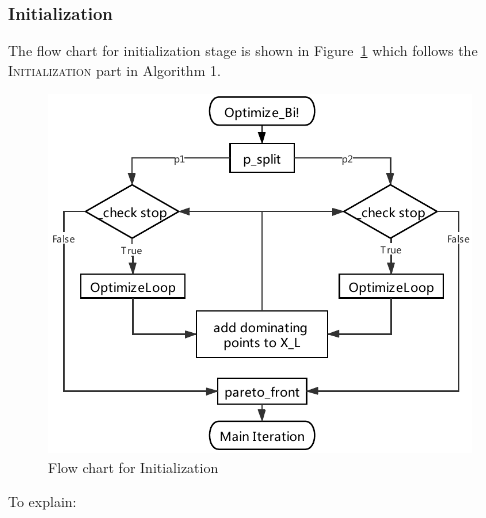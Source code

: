 \documentclass[11pt,oneside,onecolumn,openright]{article}
\begin{document}
  \subsubsection{Initialization}
  The flow chart for initialization stage is shown in Figure~\ref{fig:flow_init} which follows the \textsc{Initialization} part in  Algorithm 1.
  \begin{figure}[t] 
  \centering 
      \includegraphics[width=14cm]{fig/initialization.pdf}
        \caption{Flow chart for Initialization} 
    \label{fig:flow_init} 
  \end{figure}
  To explain:
\end{document}
